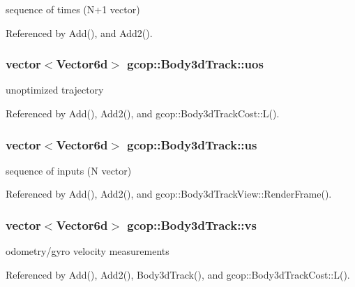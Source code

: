 sequence of times (\-N+1 vector) 



\-Referenced by \-Add(), and \-Add2().

\subsubsection[{uos}]{\setlength{\rightskip}{0pt plus 5cm}vector$<${\bf \-Vector6d}$>$ {\bf gcop\-::\-Body3d\-Track\-::uos}}\label{classgcop_1_1Body3dTrack_a5b53b01416aaa4b68100eec2032d548c}


unoptimized trajectory 



\-Referenced by \-Add(), \-Add2(), and gcop\-::\-Body3d\-Track\-Cost\-::\-L().

\subsubsection[{us}]{\setlength{\rightskip}{0pt plus 5cm}vector$<${\bf \-Vector6d}$>$ {\bf gcop\-::\-Body3d\-Track\-::us}}\label{classgcop_1_1Body3dTrack_a68e37e21af6414f673e3cc476b0e488b}


sequence of inputs (\-N vector) 



\-Referenced by \-Add(), \-Add2(), and gcop\-::\-Body3d\-Track\-View\-::\-Render\-Frame().

\subsubsection[{vs}]{\setlength{\rightskip}{0pt plus 5cm}vector$<${\bf \-Vector6d}$>$ {\bf gcop\-::\-Body3d\-Track\-::vs}}\label{classgcop_1_1Body3dTrack_a811ea7462df19f08afee419bb63604a7}


odometry/gyro velocity measurements 



\-Referenced by \-Add(), \-Add2(), \-Body3d\-Track(), and gcop\-::\-Body3d\-Track\-Cost\-::\-L().

